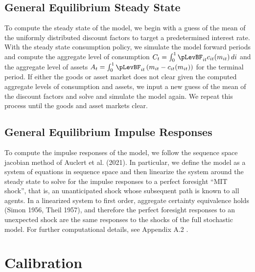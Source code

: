\documentclass[titlepage]{\econtex}\providecommand{\texname}{BufferStockTheory}
\providecommand{\TableDir}{Tables}
\begin{document}
\hypertarget{General Equilibrium Steady State}{}
\subsection{General Equilibrium Steady State}

To compute the steady state of the model, we begin with a guess of the mean of the uniformly distributed discount factors to target a predetermined interest rate.  With the steady state consumption policy, we simulate the model forward periods and compute the aggregate level of consumption $ C_{t} =  \int_{0}^{1} \pLevBF_{it} c_{it}(m_{it})\, di$  and the aggregate level of assets $ A_{t} = \int_{0}^{1} \pLevBF_{it} \left( m_{it} -  c_{it}(m_{it}) \right)$ for the terminal period. If either the goods or asset market does not clear given the computed aggregate levels of consumption and assets,  we input a new guess of the mean of the discount factors and solve and simulate the model again. We repeat this process until the goods and asset markets clear.  


\hypertarget{General Equilibrium Impulse Responses}{}
\subsection{General Equilibrium Impulse Responses}

To compute the impulse responses of the model, we follow the sequence space jacobian method of Auclert et al. (2021). In particular, we define the model as a system of equations in sequence space and then linearize the system around the steady state to solve for the impulse responses to a perfect foresight ``MIT shock'', that is, an unanticipated shock whose subsequent path is known to all agents.  In a linearized system to first order, aggregate certainty equivalence holds (Simon 1956, Theil 1957),  and therefore the perfect foresight responses to an unexpected shock are the same responses to the shocks of the full stochastic model. For further computational details, see Appendix A.2 . 






\hypertarget{Calibration}{}
\section{Calibration}


\end{document}
